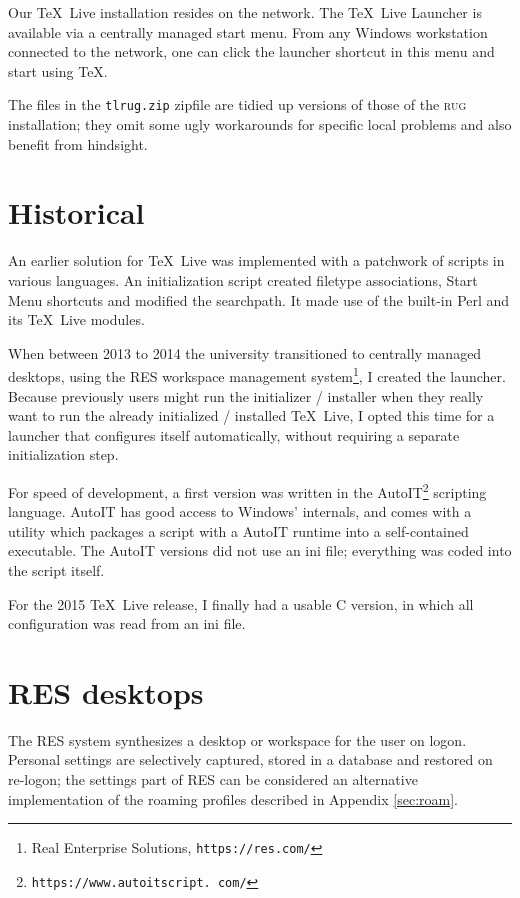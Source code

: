 \documentclass[11pt,a4paper,oneside]{report}
\def\TL{\TeX~Live}
\def\mysc#1{{\rmfamily\textsc{#1}}}
\def\RUG{\mysc{rug}}
\def\dbr{\discretionary{}{}{}}
\begin{document}
Our \TL{} installation resides on the network.  The \TL{} Launcher
is available via a centrally managed start menu. From any Windows
workstation connected to the network, one can click the launcher
shortcut in this menu and start using \TeX{}.

The files in the \texttt{tlrug.zip} zipfile are tidied up versions
of those of the \RUG{} installation; they omit some ugly workarounds
for specific local problems and also benefit from hindsight.

\section{Historical}

An earlier solution for \TL{} was implemented with a patchwork of
scripts in various languages. An initialization script created
filetype associations, Start Menu shortcuts and modified the
searchpath. It made use of the built-in Perl and its \TL{} modules.

When between 2013 to 2014 the university transitioned to centrally
managed desktops, using the RES workspace management
system\footnote{Real Enterprise Solutions,
  \texttt{https://res.com/}}, I created the launcher.  Because
previously users might run the initializer / installer when they
really want to run the already initialized / installed \TL, I opted
this time for a launcher that configures itself automatically,
without requiring a separate initialization step.

For speed of development, a first version was written in the
AutoIT\footnote{\texttt{https://\dbr www.\dbr autoitscript.\dbr
    com/}} scripting language. AutoIT has good access to Windows'
internals, and comes with a utility which packages a script with a
AutoIT runtime into a self-contained executable. The AutoIT versions
did not use an ini file; everything was coded into the script
itself.

For the 2015 \TL{} release, I finally had a usable C version, in
which all configuration was read from an ini file.

\section{RES desktops}
\label{sec:res}

The RES system synthesizes a desktop or workspace for the user on
logon. Personal settings are selectively captured, stored in a
database and restored on re-logon; the settings part of RES can be
considered an alternative implementation of the roaming profiles
described in Appendix \ref{sec:roam}.
\end{document}
